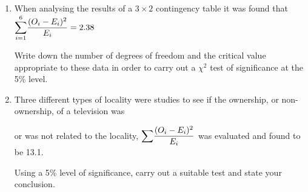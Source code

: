 \documentclass[fleqn]{article}
\begin{document}
\exercise{}
\begin{enumerate}
    \setlength\itemsep{0.5em}
    \item When analysing the results of a $3\times 2$ contingency table it was found that\vspace{2mm}\\
        ${\mathlarger\sum _{i=1}^{6}}\dfrac{( O_{i} -E_{i})^{2}}{E_{i}}=2.38$ \vspace{2mm}
        
        Write down the number of degrees of freedom and the critical value appropriate to these data in order to carry out a $\chi^2$ test of significance at the 5\% level.
    
    \item Three different types of locality were studies to see if the ownership, or non-ownership, of a  television was \par
        or was not related to the locality, ${\mathlarger\sum}\dfrac{( O_{i} -E_{i})^{2}}{E_{i}}$ was evaluated and found to be 13.1. \par
        Using a 5\% level of significance, carry out a suitable test and state your conclusion.
        

\end{enumerate}
\end{document}
